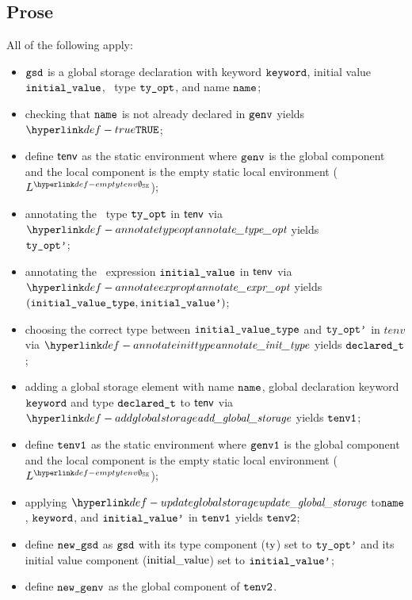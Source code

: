 \subsection{Prose}
All of the following apply:
\begin{itemize}
  \item $\texttt{gsd}$ is a global storage declaration with keyword $\texttt{keyword}$, initial value \\ $\texttt{initial\_value}$,
        \optional\ type $\texttt{ty\_opt}$, and name $\texttt{name}$;
  \item checking that $\texttt{name}$ is not already declared in $\texttt{genv}$ yields $\True$\ProseOrTypeError;
  \item define $\textsf{tenv}$ as the static environment where $\texttt{genv}$ is the global component and the local
        component is the empty static local environment ($L^{\emptytenv}$);
  \item annotating the \optional\ type $\texttt{ty\_opt}$ in $\textsf{tenv}$ via $\annotatetypeopt$ yields \\
        $\texttt{ty\_opt'}$\ProseOrTypeError;
  \item annotating the \optional\ expression $\texttt{initial\_value}$ in $\textsf{tenv}$ via $\annotateexpropt$ yields
        $(\texttt{initial\_value\_type}, \texttt{initial\_value'})$\ProseOrTypeError;
  \item choosing the correct type between $\texttt{initial\_value\_type}$ and $\texttt{ty\_opt'}$ in $tenv$ via $\annotateinittype$ yields
        $\texttt{declared\_t}$;
  \item adding a global storage element with name $\texttt{name}$, global declaration keyword \\ $\texttt{keyword}$ and type $\texttt{declared\_t}$
        to $\textsf{tenv}$ via $\addglobalstorage$ yields $\texttt{tenv1}$\ProseOrTypeError;
  \item define $\texttt{tenv1}$ as the static environment where $\texttt{genv1}$ is the global component and the local
        component is the empty static local environment ($L^{\emptytenv}$);
  \item applying $\updateglobalstorage$ to$\texttt{name}$, $\texttt{keyword}$, and $\texttt{initial\_value'}$ in $\texttt{tenv1}$ yields $\texttt{tenv2}$\ProseOrTypeError;
  \item define $\texttt{new\_gsd}$ as $\texttt{gsd}$ with its type component ($\text{ty}$) set to $\texttt{ty\_opt'}$ and its initial value component
        ($\text{initial\_value}$) set to $\texttt{initial\_value'}$;
  \item define $\texttt{new\_genv}$ as the global component of $\texttt{tenv2}$.
\end{itemize}
